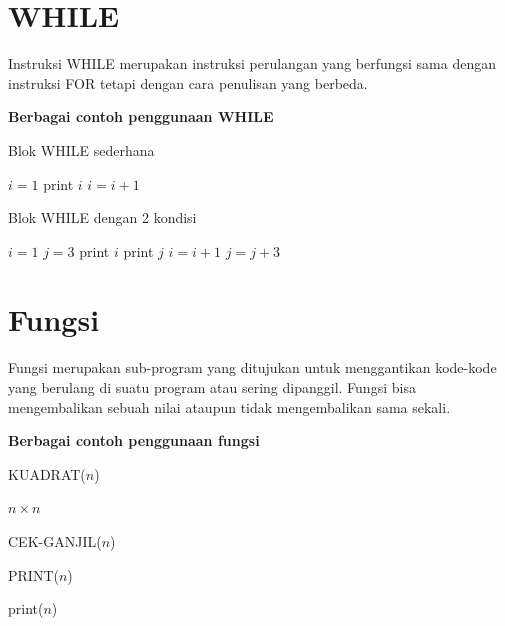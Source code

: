 \section{WHILE}
Instruksi WHILE merupakan instruksi perulangan yang berfungsi sama dengan instruksi FOR tetapi dengan cara penulisan yang berbeda.

\begin{contoh}
\textbf{Berbagai contoh penggunaan WHILE}
	\begin{algorithm}[H]
		\caption{Blok WHILE sederhana}
		\begin{algorithmic}[1]
			\STATE $i=1$
			\STATE print $i$
			\STATE $i=i+1$
		\ENDWHILE
		\end{algorithmic}
	\end{algorithm}
	
	\begin{algorithm}[H]
		\caption{Blok WHILE dengan 2 kondisi}
		\begin{algorithmic}[1]
			\STATE $i=1$
			\STATE $j=3$
			\STATE print $i$
			\STATE print $j$
			\STATE $i=i+1$
			\STATE $j=j+3$
		\ENDWHILE
		\end{algorithmic}
	\end{algorithm}
\end{contoh}




\section{Fungsi}
Fungsi merupakan sub-program yang ditujukan untuk menggantikan kode-kode yang berulang di suatu program atau sering dipanggil. Fungsi bisa mengembalikan sebuah nilai ataupun tidak mengembalikan sama sekali.

\begin{contoh}
	\textbf{Berbagai contoh penggunaan fungsi}
	\begin{algorithm}[H]
		\caption{KUADRAT($n$)}
		\begin{algorithmic}[1]
			\RETURN $n\times{}n$
		\end{algorithmic}
	\end{algorithm}
	
	\begin{algorithm}[H]
		\caption{CEK-GANJIL($n$)}
		\begin{algorithmic}[1]
				\RETURN \TRUE
			\ELSE
				\RETURN \FALSE
			\ENDIF
		\end{algorithmic}
	\end{algorithm}
	
	\begin{algorithm}[H]
		\caption{PRINT($n$)}
		\begin{algorithmic}[1]
			\STATE print($n$)
		\end{algorithmic}
	\end{algorithm}
\end{contoh}



